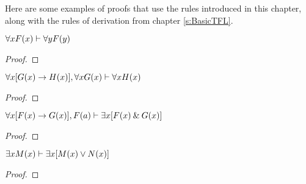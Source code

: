 Here are some examples of proofs that use the rules introduced in this chapter, along with the rules of derivation from chapter \ref{s:BasicTFL}.

\begin{earg}
\begin{minipage}{10cm}
\item $\forall xF(x) \vdash \forall yF(y)$


\begin{proof}
	 \pr{}
	 
	 
\end{proof}
\bigskip
\end{minipage}

\item $\forall x[G(x) \rightarrow H(x)], \forall xG(x) \vdash \forall xH(x)$

\begin{proof}
	 \pr{}
	 \pr{}
	 
	 
	 
	 
\end{proof}
\bigskip

\begin{minipage}{10cm}
\item $\forall x[F(x) \rightarrow G(x)], F(a) \vdash \exists x[F(x) \mathbin{\&} G(x)]$

\begin{proof}
	 \pr{}
	 \pr{}
	 
	 
	 
	 	
\end{proof}
\bigskip
\end{minipage}

\begin{minipage}{10cm}
\item $\exists xM(x) \vdash \exists x[M(x) \vee N(x)]$

\begin{proof}
	 \pr{}
	\open
		 \as{}
		 
		 
	\close
	 
\end{proof}
\bigskip
\end{minipage}



\end{earg}
